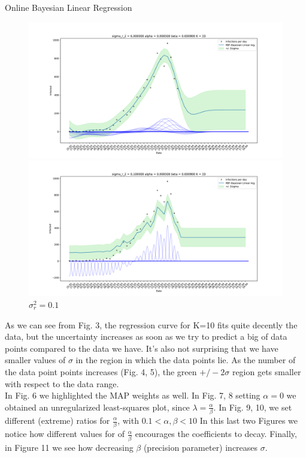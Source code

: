 \documentclass[english]{exercisesheet}
\begin{document}
\begin{nexercise}{Online Bayesian Linear Regression}
\begin{solution}
\begin{figure}
        \includegraphics[width=1\textwidth]{1.pdf}
        \caption{$\sigma_{r}^{2} = 6$}
        \includegraphics[width=1\textwidth]{2.pdf}
        \caption{$\sigma_{r}^{2} = 0.1$}
        \end{figure}
        \cleardoublepage
       As we can see from Fig. 3, the regression curve for K=10 fits quite decently the data, but the uncertainty increases as soon as we try to predict a big of data points compared to the data we have. It's also not surprising that we have smaller values of $\sigma$ in the region in which the data points lie.
       As the number of the data point points increases (Fig. 4, 5), the green $+/-2\sigma$ region gets smaller with respect to the data range.\\
       In Fig. 6 we highlighted the MAP weights as well.
       In Fig. 7, 8 setting $\alpha = 0$ we obtained an unregularized least-squares plot, since $\lambda = \frac{\alpha}{\beta}$.
       In Fig. 9, 10, we set different (extreme) ratios for $\frac{\alpha}{\beta}$, with $0.1 <\alpha, \beta < 10$
       In this last two Figures we notice how different values for of $\frac{\alpha}{\beta}$ encourages the coefficients to decay.
       Finally, in Figure 11 we see how decreasing $\beta$ (precision parameter) increases $\sigma$.
       

\end{solution}
\end{nexercise}
\end{document}
